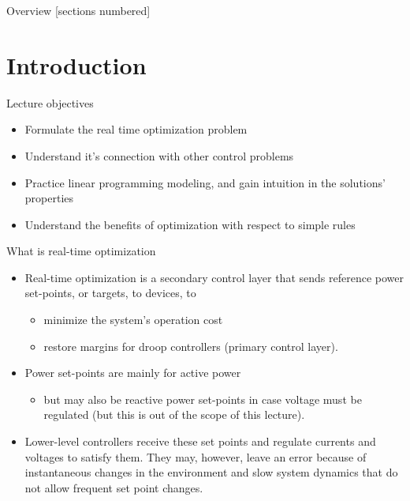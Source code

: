 \titleframe

\begin{frame}{Overview}
  [sections numbered]
  \tableofcontents[hideallsubsections]
\end{frame}

\section{Introduction}

\begin{frame} {Lecture objectives}
    \begin{itemize}
        \item Formulate the real time optimization problem
        \item Understand it's connection with other control problems
        \item Practice linear programming modeling, and gain intuition in the solutions' properties
        \item Understand the benefits of optimization with respect to simple rules
    \end{itemize}
\end{frame}

\begin{frame} {What is real-time optimization}
\begin{itemize}
\item Real-time optimization is a secondary control layer that sends reference power set-points, or targets, to devices, to 
\begin{itemize}
    \item minimize the system's operation cost
    \item restore margins for droop controllers (primary control layer). 
\end{itemize}  
\item Power set-points are mainly for active power  
\begin{itemize}
    \item but may also be reactive power set-points in case voltage must be regulated (but this is out of the scope of this lecture).
\end{itemize}
\item Lower-level controllers receive these set points and regulate currents and voltages to satisfy them. They may, however, leave an error because of instantaneous changes in the environment and slow system dynamics that do not allow frequent set point changes.
\end{itemize}
\end{frame}

